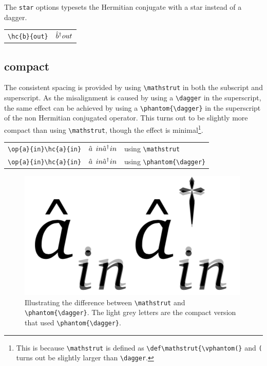 \documentclass[10pt]{article}
\begin{document}
\renewcommand{\linopconjugate}{*}

The \texttt{star} options typesets the Hermitian conjugate with a star instead of a dagger.

\begin{table}[H]
	\centering
	\begin{tabular}{ll}
		\verb|\hc{b}{out}| & $\hc{b}{out}$
	\end{tabular}
\end{table}



\subsection{compact}
The consistent spacing is provided by using \verb|\mathstrut| in both the subscript and superscript. As the misalignment is caused by using a \verb|\dagger| in the superscript, the same effect can be achieved by using a \verb|\phantom{\dagger}| in the superscript of the non Hermitian conjugated operator. This turns out to be slightly more compact than using \verb|\mathstrut|, though the effect is minimal\cprotect\footnote{This is because \verb|\mathstrut| is defined as \verb|\def\mathstrut{\vphantom(}| and \verb|(| turns out be slightly larger than \verb|\dagger|.}.

\renewcommand{\linopconjugate}{\dagger}

\begin{table}[H]
	\centering
	\begin{tabular}{lll}
		\verb|\op{a}{in}\hc{a}{in}| & $\op{a}{in}\hc{a}{in}$ & using \verb|\mathstrut| \\
		\gdef\linopsubscript{}%
		\gdef\linopsuperscript{\phantom{\dagger}}%
		\gdef\linopsuperscripthc{}%
	 	\verb|\op{a}{in}\hc{a}{in}| & $\op{a}{in}\hc{a}{in}$ & using \verb|\phantom{\dagger}| 
	\end{tabular}
\end{table}

\begin{figure}[H]
	\centering
	\includegraphics[scale=0.35]{compact}	
	\cprotect\caption{Illustrating the difference between \verb|\mathstrut| and \verb|\phantom{\dagger}|. The light grey letters are the compact version that used \verb|\phantom{\dagger}|.}
\end{figure}
\end{document}
